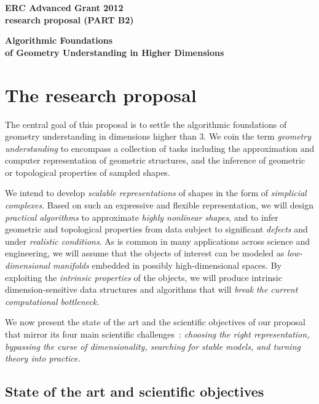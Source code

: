 \thispagestyle{empty}

\mbox{}\vspace{-3.5cm}

\begin{center}
{\Large
{\bf ERC Advanced Grant 2012 \\ research proposal (PART B2)}}
\vspace{1cm}

{\LARGE {\bf  Algorithmic Foundations \\ of 
Geometry Understanding in Higher Dimensions}

\vspace{3mm} 

}
\end{center}
\section{The research proposal}

The central goal of this proposal is to settle the algorithmic
foundations of geometry understanding in dimensions higher than 3.  We
coin the term {\em geometry understanding} to encompass a collection
of tasks including the approximation and computer representation 
of geometric structures, and the inference of geometric or topological
properties of sampled
shapes.  


We intend to develop {\em scalable representations} of shapes  in the form of {\em simplicial complexes}.
Based on such an expressive and flexible representation, we will design  {\em
practical algorithms} to approximate {\em highly nonlinear shapes}, and to
infer geometric and topological properties from data subject to
significant {\em defects} and under {\em realistic conditions}.
As is common in many applications across science and engineering, we
will assume that the objects of interest can be modeled as {\em
  low-dimensional manifolds} embedded in possibly high-dimensional
spaces. By exploiting the {\em intrinsic properties} of the objects,
we will produce intrinsic dimension-sensitive data structures and algorithms
that will {\em break the current computational
bottleneck.}  


We now present the state of the art and the scientific objectives of our proposal that mirror its four main scientific challenges~: {\em choosing the right representation, bypassing the curse of dimensionality, searching for stable models, and turning theory into practice.}


\subsection{State of the art and scientific objectives}

